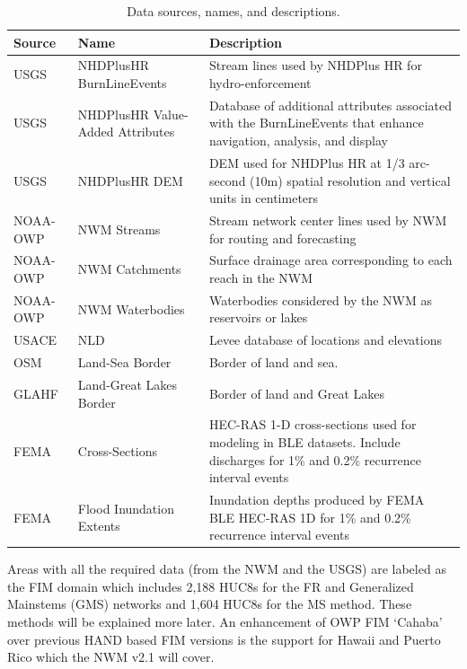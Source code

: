 \begin{table}
\caption{Data sources, names, and descriptions.}
\label{tab:data}
\centering
\begin{tabular}{|p{2cm}|p{4cm}|p{8cm}|}
\hline
Source & Name & Description \\
\hline
USGS & NHDPlusHR BurnLineEvents & Stream lines used by NHDPlus HR for hydro-enforcement \\
\hline
USGS & NHDPlusHR Value-Added Attributes & Database of additional attributes associated with the BurnLineEvents that enhance navigation, analysis, and display \\
\hline
USGS & NHDPlusHR DEM & DEM used for NHDPlus HR at 1/3 arc-second (10m) spatial resolution and vertical units in centimeters \\
\hline
NOAA-OWP & NWM Streams & Stream network center lines used by NWM for routing and forecasting \\
\hline
NOAA-OWP & NWM Catchments & Surface drainage area corresponding to each reach in the NWM \\
\hline
NOAA-OWP & NWM Waterbodies & Waterbodies considered by the NWM as reservoirs or lakes \\
\hline
USACE & NLD & Levee database of locations and elevations  \\
\hline
OSM & Land-Sea Border & Border of land and sea. \\
\hline
GLAHF & Land-Great Lakes Border & Border of land and Great Lakes \\
\hline
FEMA & Cross-Sections & HEC-RAS 1-D cross-sections used for modeling in BLE datasets. Include discharges for 1\% and 0.2\% recurrence interval events \\
\hline
FEMA & Flood Inundation Extents & Inundation depths produced by FEMA BLE HEC-RAS 1D for 1\% and 0.2\% recurrence interval events \\
\hline
\end{tabular}
\end{table}
%
Areas with all the required data (from the NWM and the USGS) are labeled as the FIM domain which includes 2,188 HUC8s for the FR and Generalized Mainstems (GMS) networks and 1,604 HUC8s for the MS method. 
These methods will be explained more later.
An enhancement of OWP FIM `Cahaba' over previous HAND based FIM versions is the support for Hawaii and Puerto Rico which the NWM v2.1 will cover.
%
